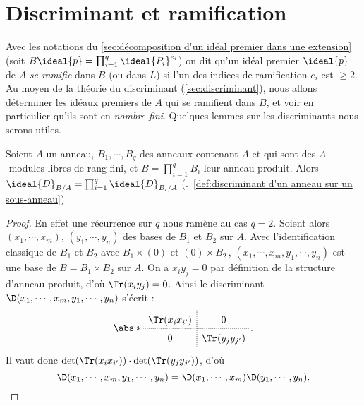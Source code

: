 \documentclass[11pt, %
  title in boldface,
  theorem in new line,
  theorem numbering = section,
  number theorems separately,
  simple name,
]{beaulivre}
\begin{document}
\section{Discriminant et ramification}\label{sec:discriminant et ramification}

    Avec les notations du \cref{sec:décomposition d'un idéal premier dans une extension} (soit \( B\ideal{p} = \prod_{i=1}^q \ideal{P_i}^{e_i} \)) on dit qu'un idéal premier \( \ideal{p} \) de \( A \) \emph{se ramifie} dans \( B \) (ou dans \( L \)) si l'un des indices de ramification \( e_i \) est \( \geqslant 2 \). Au moyen de la théorie du discriminant (\cref{sec:discriminant}), nous allons déterminer les idéaux premiers de \( A \) qui se ramifient dans \( B \), et voir en particulier qu'ils sont en \emph{nombre fini}. Quelques lemmes sur les discriminants nous serons utiles.

    \begin{lemma}\label{lem:discriminant de produit et produit de discriminant;idéal}
        Soient \( A \) un anneau, \( B_1, \cdots, B_q \) des anneaux contenant \( A \) et qui sont des \( A \)‑modules libres de rang fini, et \( B = \prod_{i=1}^q B_i \) leur anneau produit. Alors \( \ideal{D}_{B/A} = \prod_{i=1}^q \ideal{D}_{B_i/A} \) (\cf.~\cref{def:discriminant d'un anneau sur un sous-anneau})
    \end{lemma}
    \begin{proof}
        En effet une récurrence sur \( q \) nous ramène au cas \( q = 2 \). Soient alors \( (x_1, \cdots, x_m) \), \( (y_1, \cdots, y_n) \) des bases de \( B_1 \) et \( B_2 \) sur \( A \). Avec l'identification classique de \( B_1 \) et \( B_2 \) avec \( B_1 \times (0) \) et \( (0) \times B_2 \)\,, \( (x_1, \cdots, x_m, y_1, \cdots, y_n) \) est une base de \( B = B_1 \times B_2 \) sur \( A \). On a \( x_i y_j = 0 \) par définition de la structure d'anneau produit, d'où \( \Tr(x_i y_j) = 0 \). Ainsi le discriminant \( \D(x_1, \cdots, x_m, y_1, \cdots, y_n) \) s'écrit :
        \[\def\arraystretch{1.5}
            \abs*{
                \begin{array}{c;{1pt/1pt}c}
                    \Tr(x_i x_{i'}) & 0 \\\hdashline[1pt/1pt]
                    0 & \Tr(y_j y_{j'})
                \end{array}
            }.
        \]
        Il vaut donc \( \det(\Tr(x_i x_{i'})) \cdot \det(\Tr(y_j y_{j'})) \), d'où
        \[
            \D(x_1, \cdots, x_m, y_1, \cdots, y_n) = \D(x_1, \cdots, x_m) \D(y_1, \cdots, y_n).
            \qedhere
        \]
    \end{proof}
\end{document}
